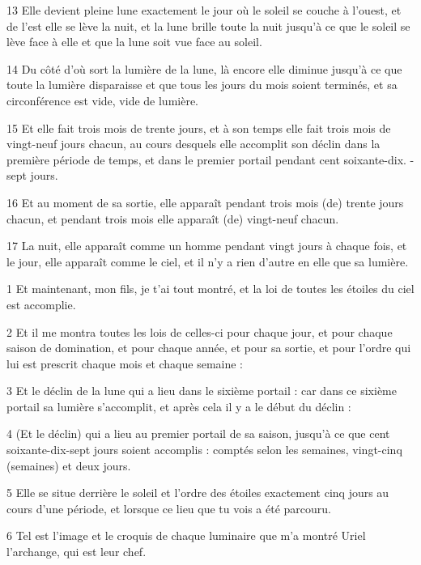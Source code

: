 \par 13 Elle devient pleine lune exactement le jour où le soleil se couche à l'ouest, et de l'est elle se lève la nuit, et la lune brille toute la nuit jusqu'à ce que le soleil se lève face à elle et que la lune soit vue face au soleil.
\par 14 Du côté d'où sort la lumière de la lune, là encore elle diminue jusqu'à ce que toute la lumière disparaisse et que tous les jours du mois soient terminés, et sa circonférence est vide, vide de lumière.
\par 15 Et elle fait trois mois de trente jours, et à son temps elle fait trois mois de vingt-neuf jours chacun, au cours desquels elle accomplit son déclin dans la première période de temps, et dans le premier portail pendant cent soixante-dix. -sept jours.
\par 16 Et au moment de sa sortie, elle apparaît pendant trois mois (de) trente jours chacun, et pendant trois mois elle apparaît (de) vingt-neuf chacun.
\par 17 La nuit, elle apparaît comme un homme pendant vingt jours à chaque fois, et le jour, elle apparaît comme le ciel, et il n'y a rien d'autre en elle que sa lumière.


\par 1 Et maintenant, mon fils, je t'ai tout montré, et la loi de toutes les étoiles du ciel est accomplie.
\par 2 Et il me montra toutes les lois de celles-ci pour chaque jour, et pour chaque saison de domination, et pour chaque année, et pour sa sortie, et pour l'ordre qui lui est prescrit chaque mois et chaque semaine :
\par 3 Et le déclin de la lune qui a lieu dans le sixième portail : car dans ce sixième portail sa lumière s'accomplit, et après cela il y a le début du déclin :
\par 4 (Et le déclin) qui a lieu au premier portail de sa saison, jusqu'à ce que cent soixante-dix-sept jours soient accomplis : comptés selon les semaines, vingt-cinq (semaines) et deux jours.
\par 5 Elle se situe derrière le soleil et l'ordre des étoiles exactement cinq jours au cours d'une période, et lorsque ce lieu que tu vois a été parcouru.
\par 6 Tel est l'image et le croquis de chaque luminaire que m'a montré Uriel l'archange, qui est leur chef.


